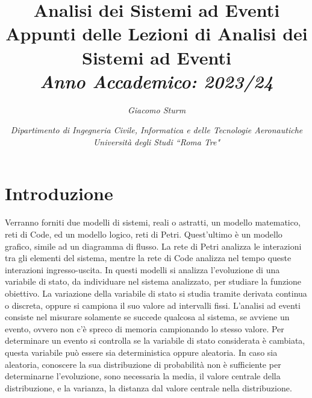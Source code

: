 \documentclass{article}
\numberwithin{equation}{subsection}
\begin{document}
\title{%
    \textbf{Analisi dei Sistemi ad Eventi}  \\ 
    \large Appunti delle Lezioni di Analisi dei Sistemi ad Eventi\\
    \textit{Anno Accademico: 2023/24}}
\author{\textit{Giacomo Sturm}}
\date{\textit{Dipartimento di Ingegneria Civile, Informatica e delle Tecnologie Aeronautiche \\
Università degli Studi ``Roma Tre"}}

\maketitle
\thispagestyle{link}

\clearpage


\pagestyle{fancy}
\fancyhead{}\fancyfoot{}
\fancyfoot[C]{\thepage}

\tableofcontents

\clearpage


\section{Introduzione}

Verranno forniti due modelli di sistemi, reali o astratti, un modello matematico, reti di Code, ed un modello logico, reti di Petri. Quest'ultimo è un modello grafico, simile ad 
un diagramma di flusso. La rete di Petri analizza le interazioni tra gli elementi del sistema, mentre la rete di Code analizza nel tempo queste interazioni ingresso-uscita. 
In questi modelli si analizza l'evoluzione di una variabile di stato, da individuare nel sistema analizzato, per studiare la funzione obiettivo. La variazione della variabile 
di stato si studia tramite derivata continua o discreta, oppure si campiona il suo valore ad intervalli fissi. L'analisi ad eventi consiste nel misurare solamente se succede 
qualcosa al sistema, se avviene un evento, ovvero non c'è spreco di memoria campionando lo stesso valore. Per determinare un evento si controlla se la variabile di stato 
considerata è cambiata, questa variabile può essere sia deterministica oppure aleatoria. In caso sia aleatoria, conoscere la sua distribuzione di probabilità non è sufficiente 
per determinarne l'evoluzione, sono necessaria la media, il valore centrale della distribuzione, e la varianza, la distanza dal valore centrale nella distribuzione. 
\end{document}
